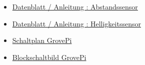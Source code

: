 \documentclass[notitlepage]{report}
\begin{document}
\begin{itemize}

\item \href{http://cdn-reichelt.de/documents/datenblatt/A300/GRV_IR_DISTANCE_AL-EN.pdf}{Datenblatt / Anleitung : Abstandssensor}

\item \href{http://www.mouser.com/catalog/specsheets/Seeed_101020022.pdf}{Datenblatt / Anleitung : Helligkeitssensor}

\item \href{https://github.com/DexterInd/GrovePi/blob/master/Hardware/GrovePi%2B%20v3.0.pdf}{Schaltplan GrovePi}

\item \href{https://github.com/DexterInd/GrovePi/blob/master/Hardware/GrovePi%20Graphical%20Datasheet.jpg}{Blockschaltbild GrovePi}

\end{itemize}
\end{document}

